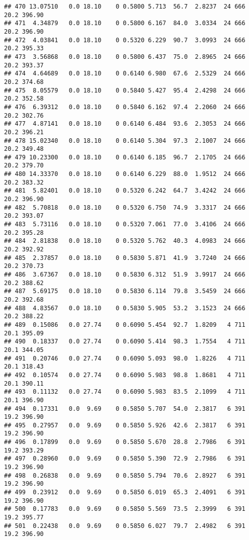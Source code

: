 \documentclass[
]{article}
\begin{document}
\begin{verbatim}
## 470 13.07510   0.0 18.10    0 0.5800 5.713  56.7  2.8237  24 666    20.2 396.90
## 471  4.34879   0.0 18.10    0 0.5800 6.167  84.0  3.0334  24 666    20.2 396.90
## 472  4.03841   0.0 18.10    0 0.5320 6.229  90.7  3.0993  24 666    20.2 395.33
## 473  3.56868   0.0 18.10    0 0.5800 6.437  75.0  2.8965  24 666    20.2 393.37
## 474  4.64689   0.0 18.10    0 0.6140 6.980  67.6  2.5329  24 666    20.2 374.68
## 475  8.05579   0.0 18.10    0 0.5840 5.427  95.4  2.4298  24 666    20.2 352.58
## 476  6.39312   0.0 18.10    0 0.5840 6.162  97.4  2.2060  24 666    20.2 302.76
## 477  4.87141   0.0 18.10    0 0.6140 6.484  93.6  2.3053  24 666    20.2 396.21
## 478 15.02340   0.0 18.10    0 0.6140 5.304  97.3  2.1007  24 666    20.2 349.48
## 479 10.23300   0.0 18.10    0 0.6140 6.185  96.7  2.1705  24 666    20.2 379.70
## 480 14.33370   0.0 18.10    0 0.6140 6.229  88.0  1.9512  24 666    20.2 383.32
## 481  5.82401   0.0 18.10    0 0.5320 6.242  64.7  3.4242  24 666    20.2 396.90
## 482  5.70818   0.0 18.10    0 0.5320 6.750  74.9  3.3317  24 666    20.2 393.07
## 483  5.73116   0.0 18.10    0 0.5320 7.061  77.0  3.4106  24 666    20.2 395.28
## 484  2.81838   0.0 18.10    0 0.5320 5.762  40.3  4.0983  24 666    20.2 392.92
## 485  2.37857   0.0 18.10    0 0.5830 5.871  41.9  3.7240  24 666    20.2 370.73
## 486  3.67367   0.0 18.10    0 0.5830 6.312  51.9  3.9917  24 666    20.2 388.62
## 487  5.69175   0.0 18.10    0 0.5830 6.114  79.8  3.5459  24 666    20.2 392.68
## 488  4.83567   0.0 18.10    0 0.5830 5.905  53.2  3.1523  24 666    20.2 388.22
## 489  0.15086   0.0 27.74    0 0.6090 5.454  92.7  1.8209   4 711    20.1 395.09
## 490  0.18337   0.0 27.74    0 0.6090 5.414  98.3  1.7554   4 711    20.1 344.05
## 491  0.20746   0.0 27.74    0 0.6090 5.093  98.0  1.8226   4 711    20.1 318.43
## 492  0.10574   0.0 27.74    0 0.6090 5.983  98.8  1.8681   4 711    20.1 390.11
## 493  0.11132   0.0 27.74    0 0.6090 5.983  83.5  2.1099   4 711    20.1 396.90
## 494  0.17331   0.0  9.69    0 0.5850 5.707  54.0  2.3817   6 391    19.2 396.90
## 495  0.27957   0.0  9.69    0 0.5850 5.926  42.6  2.3817   6 391    19.2 396.90
## 496  0.17899   0.0  9.69    0 0.5850 5.670  28.8  2.7986   6 391    19.2 393.29
## 497  0.28960   0.0  9.69    0 0.5850 5.390  72.9  2.7986   6 391    19.2 396.90
## 498  0.26838   0.0  9.69    0 0.5850 5.794  70.6  2.8927   6 391    19.2 396.90
## 499  0.23912   0.0  9.69    0 0.5850 6.019  65.3  2.4091   6 391    19.2 396.90
## 500  0.17783   0.0  9.69    0 0.5850 5.569  73.5  2.3999   6 391    19.2 395.77
## 501  0.22438   0.0  9.69    0 0.5850 6.027  79.7  2.4982   6 391    19.2 396.90

\end{verbatim}
\end{document}
